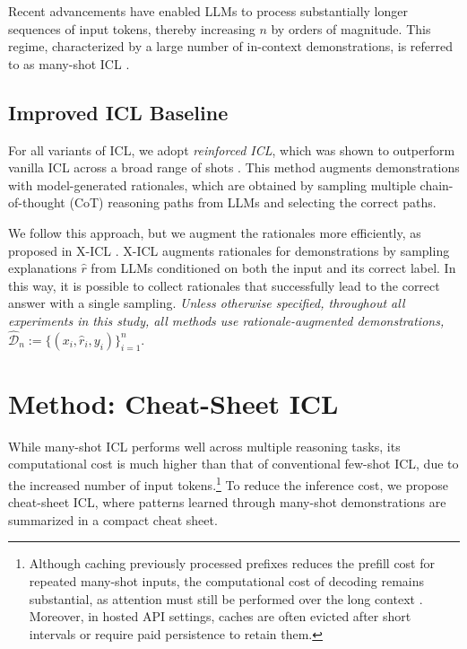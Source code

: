 \documentclass[11pt]{article}
\newcommand{\D}{\mathcal{D}}
\begin{document}
Recent advancements have enabled LLMs to process substantially longer sequences of input tokens, thereby increasing $n$ by orders of magnitude.
This regime, characterized by a large number of in-context demonstrations, is referred to as many-shot ICL \citep{agarwal2024manyshot,bertsch-etal-2025-context}.


\subsection{Improved ICL Baseline}
\label{sec:rationale_aug}
For all variants of ICL, we adopt \emph{reinforced ICL}, which was shown to outperform vanilla ICL across a broad range of shots \citep{agarwal2024manyshot}.
This method augments demonstrations with model-generated rationales, which are obtained by sampling multiple chain-of-thought (CoT) reasoning paths \citep{wei2022chain} from LLMs and selecting the correct paths.

We follow this approach, but we augment the rationales more efficiently, as proposed in X-ICL \citep{he-etal-2024-using}.
X-ICL augments rationales for demonstrations by sampling explanations $\hat{r}$ from LLMs conditioned on both the input and its correct label.
In this way, it is possible to collect rationales that successfully lead to the correct answer with a single sampling.
\emph{Unless otherwise specified, throughout all experiments in this study, all methods use rationale-augmented demonstrations, $\hat{\D}_{n} := \{(x_i, \hat{r}_i, y_i)\}_{i=1}^{n}$}.


\section{Method: Cheat-Sheet ICL}
\label{sec:method}

While many-shot ICL performs well across multiple reasoning tasks, its computational cost is much higher than that of conventional few-shot ICL, due to the increased number of input tokens.\footnote{
Although caching previously processed prefixes reduces the prefill cost for repeated many-shot inputs, the computational cost of decoding remains substantial, as attention must still be performed over the long context \citep{bertsch-etal-2025-context}.
Moreover, in hosted API settings, caches are often evicted after short intervals or require paid persistence to retain them.
}
To reduce the inference cost, we propose cheat-sheet ICL, where patterns learned through many-shot demonstrations are summarized in a compact cheat sheet.
\end{document}
